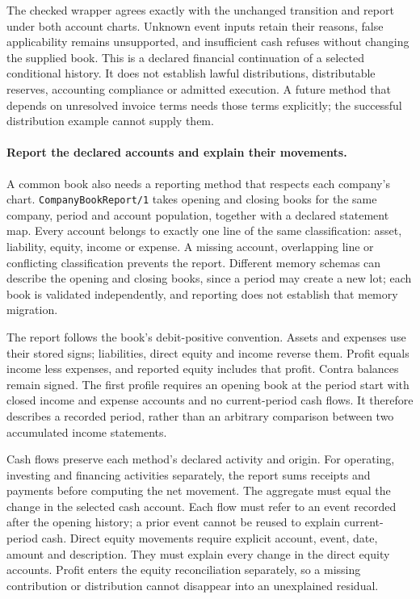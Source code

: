 The checked wrapper agrees exactly with the unchanged transition and report
under both account charts. Unknown event inputs retain their reasons, false
applicability remains unsupported, and insufficient cash refuses without
changing the supplied book. This is a declared financial continuation of a
selected conditional history. It does not establish lawful distributions,
distributable reserves, accounting compliance or admitted execution. A future
method that depends on unresolved invoice terms needs those terms explicitly;
the successful distribution example cannot supply them.


\paragraph{Report the declared accounts and explain their movements.}
A common book also needs a reporting method that respects each company's chart.
\texttt{CompanyBookReport/1} takes opening and closing books for the same company,
period and account population, together with a declared statement map. Every
account belongs to exactly one line of the same classification: asset, liability,
equity, income or expense. A missing account, overlapping line or conflicting
classification prevents the report. Different memory schemas can describe the
opening and closing books, since a period may create a new lot; each book is
validated independently, and reporting does not establish that memory migration.

The report follows the book's debit-positive convention. Assets and expenses use
their stored signs; liabilities, direct equity and income reverse them. Profit
equals income less expenses, and reported equity includes that profit. Contra
balances remain signed. The first profile requires an opening book at the period
start with closed income and expense accounts and no current-period cash flows.
It therefore describes a recorded period, rather than an arbitrary comparison
between two accumulated income statements.

Cash flows preserve each method's declared activity and origin. For operating,
investing and financing activities separately, the report sums receipts and
payments before computing the net movement. The aggregate must equal the change
in the selected cash account. Each flow must refer to an event recorded after
the opening history; a prior event cannot be reused to explain current-period
cash. Direct equity movements require explicit account, event, date, amount and
description. They must explain every change in the direct equity accounts.
Profit enters the equity reconciliation separately, so a missing contribution
or distribution cannot disappear into an unexplained residual.

